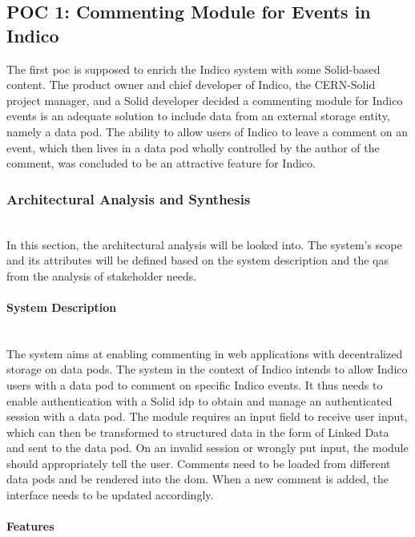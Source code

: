 \subsection{POC 1: Commenting Module for Events in Indico}\label{poc1}

The first \gls{poc} is supposed to enrich the Indico system with some Solid-based content. The product owner and chief developer of Indico, the CERN-Solid project manager, and a Solid developer decided a commenting module for Indico events is an adequate solution to include data from an external storage entity, namely a data pod. The ability to allow users of Indico to leave a comment on an event, which then lives in a data pod wholly controlled by the author of the comment, was concluded to be an attractive feature for Indico.

\subsubsection{Architectural Analysis and Synthesis}\mbox{}\\

In this section, the architectural analysis will be looked into. The system's scope and its attributes will be defined based on the system description and the \glspl{qa} from the analysis of stakeholder needs.



\vspace{0.5cm}
\paragraph{System Description}\mbox{}\\

The system aims at enabling commenting in web applications with decentralized storage on data pods. The system in the context of Indico intends to allow Indico users with a data pod to comment on specific Indico events. It thus needs to enable authentication with a Solid \gls{idp} to obtain and manage an authenticated session with a data pod. The module requires an input field to receive user input, which can then be transformed to structured data in the form of Linked Data and sent to the data pod. On an invalid session or wrongly put input, the module should appropriately tell the user. Comments need to be loaded from different data pods and be rendered into the \gls{dom}. When a new comment is added, the interface needs to be updated accordingly.
\vspace{0.5cm}
\paragraph{Features}\mbox{}\\

